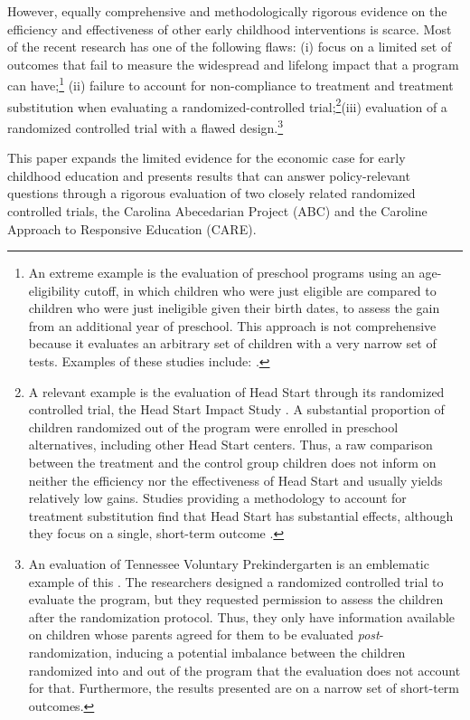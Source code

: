 However, equally comprehensive and methodologically rigorous evidence on the efficiency and effectiveness of other early childhood interventions is scarce. Most of the recent research has one of the following flaws: (i) focus on a limited set of outcomes that fail to measure the widespread and lifelong impact that a program can have;\footnote{An extreme example is the evaluation of preschool programs using an age-eligibility cutoff, in which children who were just eligible are compared to children who were just ineligible given their birth dates, to assess the gain from an additional year of preschool. This approach is not comprehensive because it evaluates an arbitrary set of children with a very narrow set of tests. Examples of these studies include: \citep{Gormley_Gayer_2005_JHR,Gormley_Gayer_etal_2005_DP,Weiland_2013_CD_Impacts-of-Pre-K}.} (ii) failure to account for non-compliance to treatment and treatment substitution when evaluating a randomized-controlled trial;\footnote{A relevant example is the evaluation of Head Start through its randomized controlled trial, the Head Start Impact Study \citep{Puma_Bell_etal_2010_HeadStartImpact}. A substantial proportion of children randomized out of the program were enrolled in preschool alternatives, including other Head Start centers. Thus, a raw comparison between the treatment and the control group children does not inform on neither the efficiency nor the effectiveness of Head Start and usually yields relatively low gains. Studies providing a methodology to account for treatment substitution find that Head Start has substantial effects, although they focus on a single, short-term outcome \citep{Kline-Walters_2015_NBER-Evaluating,Feller_Grindal_etal_2016_ComparedtoWhat}.}(iii) evaluation of a randomized controlled trial with a flawed design.\footnote{An evaluation of Tennessee Voluntary Prekindergarten is an emblematic example of this \citep{Lipsey_et_al_2013_Tennessee_Kindergrtn_PRI,Lipsey_et_al_2015_Randomized_Control_Trial_PRI}. The researchers designed a randomized controlled trial to evaluate the program, but they requested permission to assess the children after the randomization protocol. Thus, they only have information available on children whose parents agreed for them to be evaluated \textit{post}-randomization, inducing a potential imbalance between the children randomized into and out of the program that the evaluation does not account for that. Furthermore, the results presented are on a narrow set of short-term outcomes.} 

This paper expands the limited evidence for the economic case for early childhood education and presents results that can answer policy-relevant questions through a rigorous evaluation of two closely related randomized controlled trials, the Carolina Abecedarian Project (ABC) and the Caroline Approach to Responsive Education (CARE).

